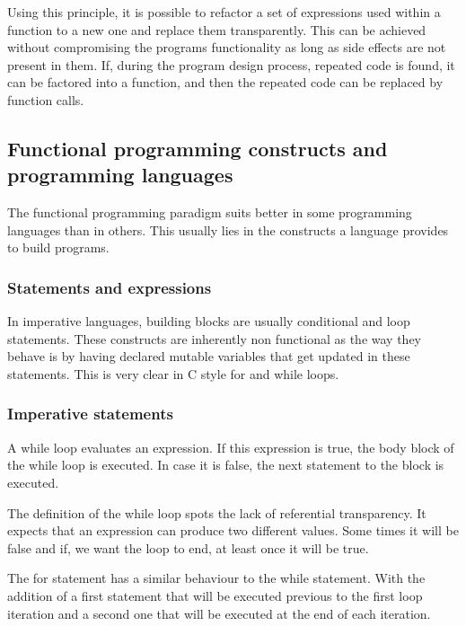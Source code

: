 \documentclass[../main.tex]{subfiles}
\begin{document}


Using this principle, it is possible to refactor a set of expressions used within
a function to a new one and replace them transparently. This can be achieved
without compromising the programs functionality as long as side effects are not
present in them. If, during the program design process, repeated code is found,
it can be factored into a function, and then the repeated code can be replaced by
function calls.

\subsection{Functional programming constructs and programming languages} The
functional programming paradigm suits better in some programming languages than
in others. This usually lies in the constructs a language provides to build
programs.

\subsubsection{Statements and expressions} In imperative languages, building
blocks are usually conditional and loop statements. These constructs are
inherently non functional as the way they behave is by having declared mutable variables
that get updated in these statements. This is very clear in C style for and
while loops.

\subsubsection{Imperative statements} A while loop evaluates an expression. If
this expression is true, the body block of the while loop is executed. In case it is
false, the next statement to the block is executed.

The definition of the while loop spots the lack of referential transparency. It
expects that an expression can produce two different values. Some times it will
be false and if, we want the loop to end, at least once it will be true.

The for statement has a similar behaviour to the while statement. With the addition of a first
statement that will be executed previous to the first loop iteration and a second one that
will be executed at the end of each iteration.
\end{document}
